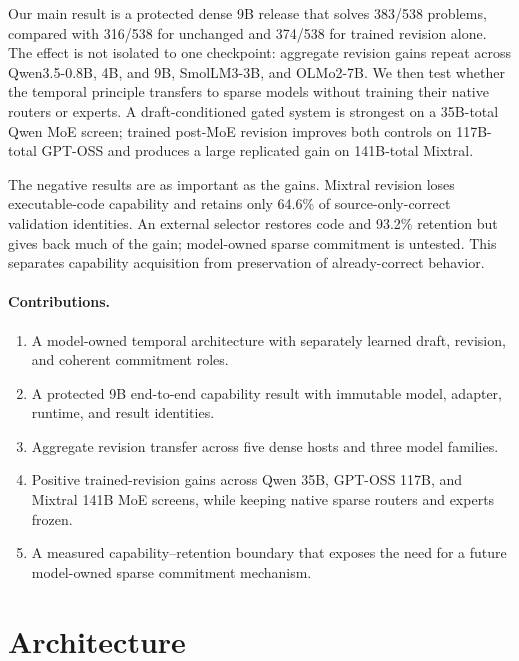 \documentclass[10pt]{article}
\begin{document}
Our main result is a protected dense 9B release that solves 383/538 problems,
compared with 316/538 for unchanged and 374/538 for trained revision alone.
The effect is not isolated to one checkpoint: aggregate revision gains repeat
across Qwen3.5-0.8B, 4B, and 9B, SmolLM3-3B, and OLMo2-7B. We then test whether
the temporal principle transfers to sparse models without training their
native routers or experts. A draft-conditioned gated system is strongest on a
35B-total Qwen MoE screen; trained post-MoE revision improves both controls on
117B-total GPT-OSS and produces a large replicated gain on 141B-total Mixtral.

The negative results are as important as the gains. Mixtral revision loses
executable-code capability and retains only 64.6\% of source-only-correct
validation identities. An external selector restores code and 93.2\%
retention but gives back much of the gain; model-owned sparse commitment is
untested. This separates capability acquisition from preservation of
already-correct behavior.

\paragraph{Contributions.}
\begin{enumerate}
  \item A model-owned temporal architecture with separately learned draft,
        revision, and coherent commitment roles.
  \item A protected 9B end-to-end capability result with immutable model,
        adapter, runtime, and result identities.
  \item Aggregate revision transfer across five dense hosts and three model
        families.
  \item Positive trained-revision gains across Qwen 35B, GPT-OSS 117B, and
        Mixtral 141B MoE screens, while keeping native sparse routers and
        experts frozen.
  \item A measured capability--retention boundary that exposes the need for a
        future model-owned sparse commitment mechanism.
\end{enumerate}

\section{Architecture}
\end{document}
